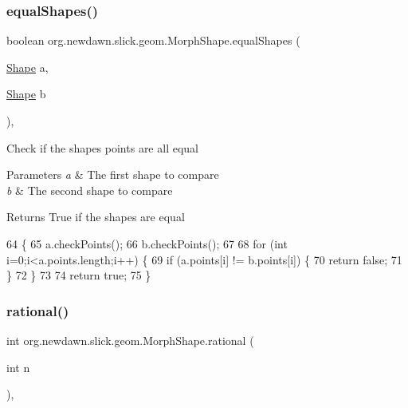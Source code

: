 \subsubsection{\texorpdfstring{equal\+Shapes()}{equalShapes()}}
{\footnotesize\ttfamily boolean org.\+newdawn.\+slick.\+geom.\+Morph\+Shape.\+equal\+Shapes (\begin{DoxyParamCaption}\item[{\mbox{\hyperlink{classorg_1_1newdawn_1_1slick_1_1geom_1_1_shape}{Shape}}}]{a,  }\item[{\mbox{\hyperlink{classorg_1_1newdawn_1_1slick_1_1geom_1_1_shape}{Shape}}}]{b }\end{DoxyParamCaption})\hspace{0.3cm}{\ttfamily [inline]}, {\ttfamily [private]}}

Check if the shape\textquotesingle{}s points are all equal


\begin{DoxyParams}{Parameters}
{\em a} & The first shape to compare \\
\hline
{\em b} & The second shape to compare \\
\hline
\end{DoxyParams}
\begin{DoxyReturn}{Returns}
True if the shapes are equal 
\end{DoxyReturn}

\begin{DoxyCode}
64                                                   \{
65         a.checkPoints();
66         b.checkPoints();
67         
68         \textcolor{keywordflow}{for} (\textcolor{keywordtype}{int} i=0;i<a.points.length;i++) \{
69             \textcolor{keywordflow}{if} (a.points[i] != b.points[i]) \{
70                 \textcolor{keywordflow}{return} \textcolor{keyword}{false};
71             \}
72         \}
73         
74         \textcolor{keywordflow}{return} \textcolor{keyword}{true};
75     \}
\end{DoxyCode}
\mbox{\label{classorg_1_1newdawn_1_1slick_1_1geom_1_1_morph_shape_ad93f28ac5dd367627bfadbd8fec48213}} 
\subsubsection{\texorpdfstring{rational()}{rational()}}
{\footnotesize\ttfamily int org.\+newdawn.\+slick.\+geom.\+Morph\+Shape.\+rational (\begin{DoxyParamCaption}\item[{int}]{n }\end{DoxyParamCaption})\hspace{0.3cm}{\ttfamily [inline]}, {\ttfamily [private]}}

